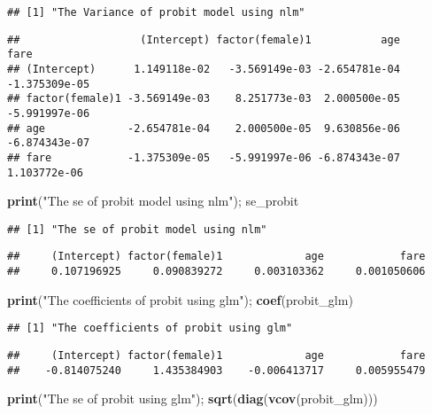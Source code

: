 \documentclass[
  12pt,
]{article}
\newenvironment{Shaded}{\begin{snugshade}}{\end{snugshade}}
\newcommand{\KeywordTok}[1]{\textcolor[rgb]{0.13,0.29,0.53}{\textbf{#1}}}
\newcommand{\NormalTok}[1]{#1}
\newcommand{\StringTok}[1]{\textcolor[rgb]{0.31,0.60,0.02}{#1}}
\begin{document}
\begin{verbatim}
## [1] "The Variance of probit model using nlm"
\end{verbatim}

\begin{verbatim}
##                   (Intercept) factor(female)1           age          fare
## (Intercept)      1.149118e-02   -3.569149e-03 -2.654781e-04 -1.375309e-05
## factor(female)1 -3.569149e-03    8.251773e-03  2.000500e-05 -5.991997e-06
## age             -2.654781e-04    2.000500e-05  9.630856e-06 -6.874343e-07
## fare            -1.375309e-05   -5.991997e-06 -6.874343e-07  1.103772e-06
\end{verbatim}

\begin{Shaded}
\begin{Highlighting}[]
\KeywordTok{print}\NormalTok{(}\StringTok{"The se of probit model using nlm"}\NormalTok{); se\_probit}
\end{Highlighting}
\end{Shaded}

\begin{verbatim}
## [1] "The se of probit model using nlm"
\end{verbatim}

\begin{verbatim}
##     (Intercept) factor(female)1             age            fare 
##     0.107196925     0.090839272     0.003103362     0.001050606
\end{verbatim}

\begin{Shaded}
\begin{Highlighting}[]
\KeywordTok{print}\NormalTok{(}\StringTok{"The coefficients of probit using glm"}\NormalTok{); }\KeywordTok{coef}\NormalTok{(probit\_glm)}
\end{Highlighting}
\end{Shaded}

\begin{verbatim}
## [1] "The coefficients of probit using glm"
\end{verbatim}

\begin{verbatim}
##     (Intercept) factor(female)1             age            fare 
##    -0.814075240     1.435384903    -0.006413717     0.005955479
\end{verbatim}

\begin{Shaded}
\begin{Highlighting}[]
\KeywordTok{print}\NormalTok{(}\StringTok{"The se of probit using glm"}\NormalTok{); }\KeywordTok{sqrt}\NormalTok{(}\KeywordTok{diag}\NormalTok{(}\KeywordTok{vcov}\NormalTok{(probit\_glm)))}
\end{Highlighting}
\end{Shaded}
\end{document}
